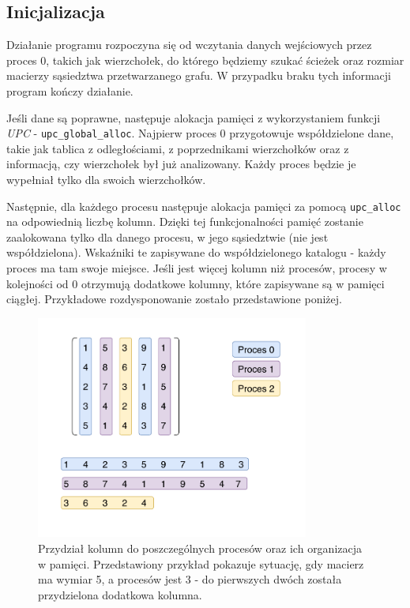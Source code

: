 \documentclass[12pt]{article}
\begin{document}
\subsection{Inicjalizacja}
Działanie programu rozpoczyna się od wczytania danych wejściowych przez proces 0, takich jak wierzchołek, do którego będziemy szukać ścieżek oraz rozmiar macierzy sąsiedztwa przetwarzanego grafu. W przypadku braku tych informacji program kończy działanie.

Jeśli dane są poprawne, następuje alokacja pamięci z wykorzystaniem funkcji \textit{UPC} - \lstinline{upc_global_alloc}. Najpierw proces 0 przygotowuje współdzielone dane, takie jak tablica z odległościami, z poprzednikami wierzchołków oraz z informacją, czy wierzchołek był już analizowany. Każdy proces będzie je wypełniał tylko dla swoich wierzchołków.

Następnie, dla każdego procesu następuje alokacja pamięci za pomocą \lstinline{upc_alloc} na odpowiednią liczbę kolumn. Dzięki tej funkcjonalności pamięć zostanie zaalokowana tylko dla danego procesu, w jego sąsiedztwie (nie jest współdzielona). Wskaźniki te zapisywane do współdzielonego katalogu - każdy proces ma tam swoje miejsce. Jeśli jest więcej kolumn niż procesów, procesy w kolejności od 0 otrzymują dodatkowe kolumny, które zapisywane są w pamięci ciągłej. Przykładowe rozdysponowanie zostało przedstawione poniżej. 

\begin{figure}[H]
\centering
\includegraphics[width=0.8\textwidth]{data_division.pdf}
\caption{Przydział kolumn do poszczególnych procesów oraz ich organizacja w pamięci. Przedstawiony przykład pokazuje sytuację, gdy macierz ma wymiar 5, a procesów jest 3 - do pierwszych dwóch została przydzielona dodatkowa kolumna.}
\end{figure}
\end{document}
